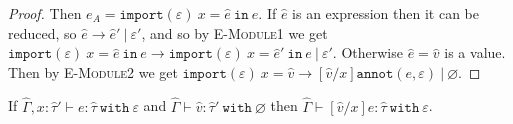 \documentclass{llncs}
\newcommand{\keywadj}[1]{\mathtt{#1}}
\newcommand{\keyw}[1]{\keywadj{#1}~}
\newcommand{\kw}[1]{\keyw{ #1 }}
\newcommand{\kwa}[1]{\keywadj{ #1 }}
\newcommand{\module}[0]{
\kwa{import}(\varepsilon)~x = \hat e~\kwa{in}~e
}
\begin{document}
\begin{proof}
\noindent
{}
Then $e_A = \module$. If $\hat e$ is an expression then it can be reduced, so $\hat e \longrightarrow \hat e' ~|~\varepsilon'$, and so by \textsc{E-Module1} we get $\module \longrightarrow \kwa{import}(\varepsilon)~x = \hat e'~\kw{in} e ~|~\varepsilon'$. Otherwise $\hat e = \hat v$ is a value. Then by \textsc{E-Module2} we get $\kwa{import}(\varepsilon)~x = \hat v \longrightarrow [\hat v/x]\kwa{annot}(e, \varepsilon)~|~\varnothing$.
\end{proof}

\hrulefill

\begin{lemma}[Substitution]
If $\hat \Gamma, x: \hat \tau' \vdash e: \hat \tau~\kw{with} \varepsilon$ and $\hat \Gamma \vdash \hat v: \hat \tau'~\kw{with} \varnothing$ then $\hat \Gamma \vdash [\hat v/x]e: \hat \tau~\kw{with} \varepsilon$.
\end{lemma}
\end{document}
